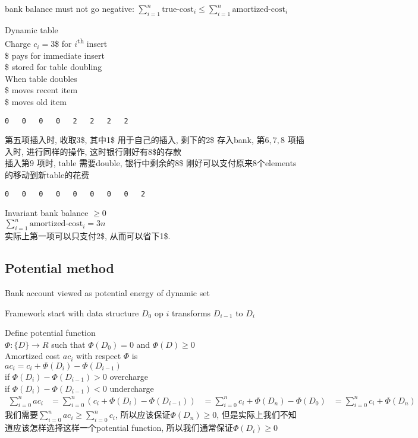 \documentclass{article}
\begin{document}
bank balance must not go negative:
$\sum_{i=1}^n \mbox{true-cost}_i \leq \sum_{i=1}^n \mbox{amortized-cost}_i$

\bigskip
Dynamic table\\
Charge $c_i = 3$\$ for $i$\textsuperscript{th} insert\\
\$ pays for immediate insert\\
\$ stored for table doubling\\
When table doubles\\
	\$ moves recent item\\
	\$ moves old item
\begin{verbatim}
0	0	0	0	2	2	2	2
\end{verbatim}
第五项插入时, 收取3\$, 其中1\$ 用于自己的插入, 剩下的2\$ 存入bank, 第$6, 7, 8$ 项插入时, 进行同样的操作, 这时银行刚好有8\$的存款\\
插入第$9$ 项时, table 需要double, 银行中剩余的8\$ 刚好可以支付原来$8$个elements 的移动到新table的花费
\begin{verbatim}
0	0	0	0	0	0	0	0	2
\end{verbatim}

Invariant bank balance $\geq 0$\\
$\sum_{i=1}^n \mbox{amortized-cost}_i =  3n$\\
实际上第一项可以只支付2\$, 从而可以省下1\$.

\subsection{Potential method}
Bank account viewed as potential energy of dynamic set

Framework
start with data structure $D_0$
op $i$ transforms $D_{i-1}$ to $D_{i}$

Define potential function\\
$\Phi: \{D\} \rightarrow R$ such that $\Phi(D_0) = 0$ and $\Phi(D) \geq 0$\\
Amortized cost $ac_i$ with respect $\Phi$ is\\
$ac_i = c_i + \Phi(D_i) - \Phi(D_{i-1})$\\
if $\Phi(D_i) - \Phi(D_{i-1})>0$ overcharge\\
if $\Phi(D_i) - \Phi(D_{i-1})<0$ undercharge
$$
\begin{aligned}
\sum_{i=0}^n ac_i
&= \sum_{i=0}^n (c_i + \Phi(D_i) - \Phi(D_{i-1}))
&= \sum_{i=0}^n c_i + \Phi(D_n) - \Phi(D_0)
&= \sum_{i=0}^n c_i + \Phi(D_n)
\end{aligned}
$$
我们需要$\sum_{i=0}^n ac_i \geq \sum_{i=0}^n c_i$, 所以应该保证$\Phi(D_n)\geq 0$, 但是实际上我们不知道应该怎样选择这样一个potential function, 所以我们通常保证$\Phi(D_i) \geq 0$
\end{document}
